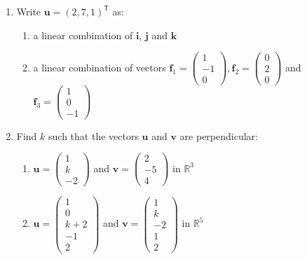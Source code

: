 \documentclass[a4paper,11pt]{article}
\begin{document}
\begin{enumerate}[label=3.\arabic*]
    \item Write $\mathbf{u} = (2,7,1)^\mathsf{T}$ as:
    \begin{enumerate}
        \item a linear combination of $\mathbf{i}$, $\mathbf{j}$ and $\mathbf{k}$
        \item a linear combination of vectors $\mathbf{f}_1 = \begin{pmatrix} 1 \\ -1 \\ 0 \end{pmatrix}, \mathbf{f}_2 = \begin{pmatrix} 0 \\ 2 \\ 0 \end{pmatrix}$ and $\mathbf{f}_3 = \begin{pmatrix} 1 \\ 0 \\ -1 \end{pmatrix}$
    \end{enumerate}

    \item Find $k$ such that the vectors $\mathbf{u}$ and $\mathbf{v}$ are perpendicular:
    \begin{enumerate}
        \item $\mathbf{u} = \begin{pmatrix} 1 \\ k \\ -2 \end{pmatrix}$ and $\mathbf{v} = \begin{pmatrix} 2 \\ -5 \\ 4 \end{pmatrix}$ in $\mathbb{R}^3$

        \item $\mathbf{u} = \begin{pmatrix} 1 \\ 0 \\ k + 2 \\ -1 \\ 2 \end{pmatrix}$ and $\mathbf{v} = \begin{pmatrix} 1 \\ k \\ -2 \\ 1 \\ 2 \end{pmatrix}$ in $\mathbb{R}^5$
    \end{enumerate}


\end{enumerate}
\end{document}
